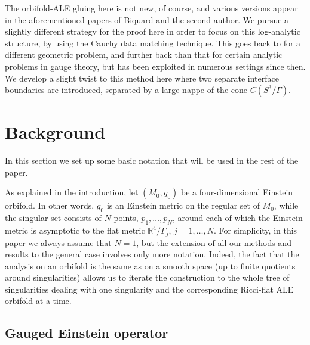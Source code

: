\documentclass[12pt]{article}
\newcommand{\RR}{\mathbb R}
\begin{document}
The orbifold-ALE gluing here is not new, of course, and various versions appear in the aforementioned papers
of Biquard and the second author.  We pursue a slightly different strategy for the proof here in order to
focus on this log-analytic structure, by using the Cauchy data matching technique.  This goes back to
\cite{MPP} for a different geometric problem, and further back than that for certain analytic problems in
gauge theory, but has been exploited in numerous settings since then.  We develop a slight twist to this
method here where two separate interface boundaries are introduced, separated by a large nappe of
the cone $C( S^3/\Gamma)$.

\section{Background}
In this section we set up some basic notation that will be used in the rest of the paper.

As explained in the introduction, let $(M_0, g_0)$ be a four-dimensional Einstein orbifold. In other words, $g_0$
is an Einstein metric on the regular set of $M_0$, while the singular set consists of $N$ points, $p_1, \ldots, p_N$,
around each of which the Einstein metric is asymptotic to the flat metric $\RR^4/\Gamma_j$, $j = 1, \ldots, N$.
For simplicity, in this paper we always assume that $N = 1$, but the extension of all our methods and results
to the general case involves only more notation.  Indeed, the fact that the analysis on an orbifold is the same as on a smooth space (up to finite quotients around singularities) allows us to iterate the construction to the whole tree of singularities dealing with one singularity and the corresponding Ricci-flat ALE orbifold at a time.

\subsection{Gauged Einstein operator}
\end{document}
